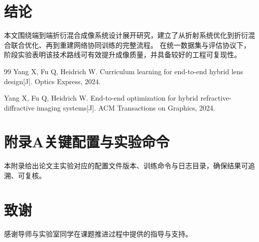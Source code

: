 \documentclass[UTF8,12pt,a4paper,openany,fontset=fandol]{ctexbook}
\begin{document}

\clearpage

\clearpage

\frontmatter
\pagestyle{bitpage}

\clearpage

\clearpage

\tableofcontents
\clearpage

\mainmatter
\pagestyle{bitpage}




\chapter*{结\quad 论}

本文围绕端到端折衍混合成像系统设计展开研究，建立了从折射系统优化到折衍混合联合优化、再到重建网络协同训练的完整流程。
在统一数据集与评估协议下，阶段实验表明该技术路线可有效提升成像质量，并具备较好的工程可复现性。



\begin{thebibliography}{99}
Yang X, Fu Q, Heidrich W. Curriculum learning for end-to-end hybrid lens design[J]. Optics Express, 2024.

Yang X, Fu Q, Heidrich W. End-to-end optimization for hybrid refractive-diffractive imaging systems[J]. ACM Transactions on Graphics, 2024.
\end{thebibliography}

\chapter*{附录A\quad 关键配置与实验命令}

本附录给出论文主实验对应的配置文件版本、训练命令与日志目录，确保结果可追溯、可复核。

\chapter*{致\quad 谢}

感谢导师与实验室同学在课题推进过程中提供的指导与支持。
\end{document}
